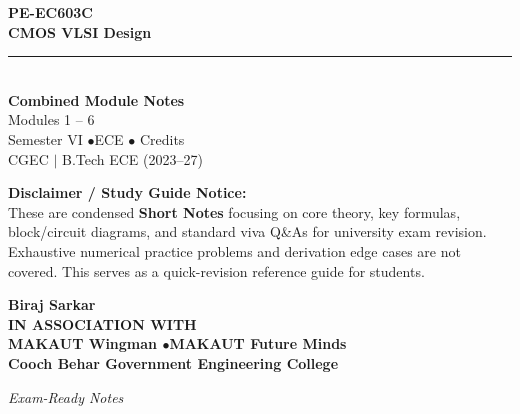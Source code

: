 \documentclass[12pt,a4paper]{article}
\begin{document}
\thispagestyle{empty}


\vspace*{1.0cm}
\begin{center}
  {\Huge\bfseries\color{myred} PE-EC603C}\\[10pt]
  {\LARGE\bfseries\color{mydark} CMOS VLSI Design}\\[20pt]
  {\color{myred}\rule{0.7\linewidth}{1.5pt}}\\[18pt]
  {\Large\color{myteal}\textbf{Combined Module Notes}}\\[8pt]
  {\large\color{mydark} Modules 1 -- 6}\\[40pt]
  {\normalsize\color{mydark} Semester VI \quad$\bullet$\quad ECE \quad$\bullet$ Credits}\\[12pt]
  {\normalsize\color{mydark} CGEC \;$|$\; B.Tech ECE (2023--27)}
\end{center}
\vspace{1.0cm}
\begin{center}
  \begin{tcolorbox}[colback=mygray, colframe=mgframe, boxrule=0.5pt, arc=3pt, width=0.85\linewidth]
    \centering\small\color{mydark}
    \textbf{Disclaimer / Study Guide Notice:}\\
    These are condensed \textbf{Short Notes} focusing on core theory, key formulas, block/circuit diagrams, and standard viva Q\&As for university exam revision. Exhaustive numerical practice problems and derivation edge cases are not covered. This serves as a quick-revision reference guide for students.
  \end{tcolorbox}
\end{center}
\vfill
\vspace{0.6cm}
\begin{center}
  {\large\bfseries\color{mypurple} Biraj Sarkar}\\[16pt]
  {\footnotesize\color{watermark}\textbf{IN ASSOCIATION WITH}}\\[8pt]
  {\small\bfseries\color{mydark} MAKAUT Wingman \quad$\bullet$\quad MAKAUT Future Minds}\\[12pt]
  {\large\bfseries\color{myteal} Cooch Behar Government Engineering College}
\end{center}
\vfill
\begin{center}{\small\color{watermark}\textit{Exam-Ready Notes}}\end{center}
\clearpage
\end{document}
